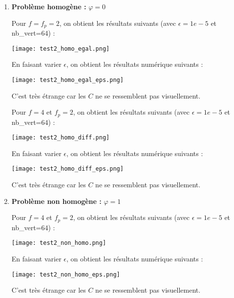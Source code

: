 \begin{enumerate}[label=\textbullet]
	\item \textbf{Problème homogène :} $\varphi=0$
	
	Pour $f=f_p=2$, on obtient les résultats suivants (avec $\epsilon=1e-5$ et nb\_vert=64) :
	
	\begin{minipage}{\linewidth}
		\centering
		\texttt{[image: test2\_homo\_egal.png]}
	\end{minipage}

	En faisant varier $\epsilon$, on obtient les résultats numérique suivants :
	
	\begin{minipage}{\linewidth}
		\centering
		\texttt{[image: test2\_homo\_egal\_eps.png]}
	\end{minipage}
	
	C'est très étrange car les $C$ ne se ressemblent pas visuellement.
	
	Pour $f=4$ et $f_p=2$, on obtient les résultats suivants (avec $\epsilon=1e-5$ et nb\_vert=64) :
	
	\begin{minipage}{\linewidth}
		\centering
		\texttt{[image: test2\_homo\_diff.png]}
	\end{minipage}
	
	En faisant varier $\epsilon$, on obtient les résultats numérique suivants :
	
	\begin{minipage}{\linewidth}
		\centering
		\texttt{[image: test2\_homo\_diff\_eps.png]}
	\end{minipage}
	
	C'est très étrange car les $C$ ne se ressemblent pas visuellement.
	
	\item \textbf{Problème non homogène :} $\varphi=1$
	
	Pour $f=4$ et $f_p=2$, on obtient les résultats suivants (avec $\epsilon=1e-5$ et nb\_vert=64) :
	
	\begin{minipage}{\linewidth}
		\centering
		\texttt{[image: test2\_non\_homo.png]}
	\end{minipage}
	
	En faisant varier $\epsilon$, on obtient les résultats numérique suivants :
	
	\begin{minipage}{\linewidth}
		\centering
		\texttt{[image: test2\_non\_homo\_eps.png]}
	\end{minipage}
	
	C'est très étrange car les $C$ ne se ressemblent pas visuellement.
	
	
\end{enumerate}

